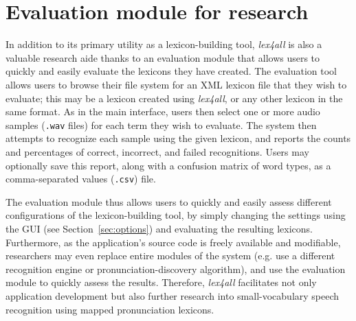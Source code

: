 \documentclass[11pt]{article}
\begin{document}



\section{Evaluation module for research}
\label{sec:evaluation}

In addition to its primary utility as a lexicon-building tool, \textit{lex4all} is also a valuable research aide thanks to an evaluation module that allows users to quickly and easily evaluate the lexicons they have created. The evaluation tool allows users to browse their file system for an XML lexicon file that they wish to evaluate; this may be a lexicon created using \textit{lex4all}, or any other lexicon in the same format. 
As in the main interface, users then select one or more audio samples (\texttt{.wav} files) for each term they wish to evaluate.
The system then attempts to recognize each sample using the given lexicon, and reports the counts and percentages
of correct, incorrect, and failed recognitions.
Users may optionally save this report, along with a confusion matrix of word types, as a comma-separated values (\texttt{.csv}) file.

The evaluation module thus allows users to quickly and easily assess different configurations of the lexicon-building tool, by simply changing the settings using the GUI (see Section~\ref{sec:options}) and evaluating the resulting lexicons. Furthermore, as the application's source code is freely available and modifiable, researchers may even replace entire modules of the system 
(e.g. use a 
different recognition engine or 
pronunciation-discovery algorithm), and use the evaluation module to quickly assess the results. 
Therefore, \textit{lex4all} facilitates not only application development but also further research into small-vocabulary speech recognition using mapped pronunciation lexicons.
\end{document}
